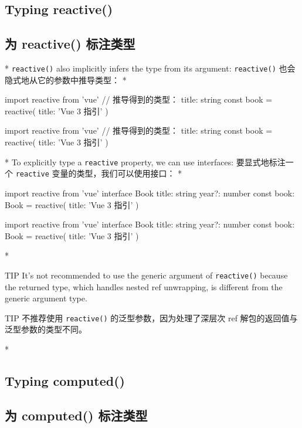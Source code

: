 \begin{paracol}{2}
\subsection{Typing reactive()}
\switchcolumn
\subsection{为 reactive() 标注类型}
\switchcolumn[0]*%
\texttt{reactive()} also implicitly infers the type from its argument:
\switchcolumn
\texttt{reactive()} 也会隐式地从它的参数中推导类型：
\switchcolumn[0]*%
\begin{codeTs}
import { reactive } from 'vue'
// 推导得到的类型：{ title: string }
const book = reactive({ title: 'Vue 3 指引' })
\end{codeTs}
\switchcolumn
\begin{codeTs}
import { reactive } from 'vue'
// 推导得到的类型：{ title: string }
const book = reactive({ title: 'Vue 3 指引' })
\end{codeTs}
\switchcolumn[0]*%
To explicitly type a \texttt{reactive} property, we can use interfaces:
\switchcolumn
要显式地标注一个 \texttt{reactive} 变量的类型，我们可以使用接口：
\switchcolumn[0]*%
\begin{codeTs}
import { reactive } from 'vue'
interface Book {
  title: string
  year?: number
}
const book: Book = reactive({ title: 'Vue 3 指引' })
\end{codeTs}
\switchcolumn
\begin{codeTs}
import { reactive } from 'vue'
interface Book {
  title: string
  year?: number
}
const book: Book = reactive({ title: 'Vue 3 指引' })
\end{codeTs}
\switchcolumn[0]*%
\begin{vueQuote}{TIP}
It's not recommended to use the generic argument of \texttt{reactive()}
because the returned type, which handles nested ref unwrapping, is
different from the generic argument type.
\end{vueQuote} 
\switchcolumn
\begin{vueQuote}{TIP}
不推荐使用 \texttt{reactive()} 的泛型参数，因为处理了深层次 ref
解包的返回值与泛型参数的类型不同。
\end{vueQuote} 
\switchcolumn[0]*%
\subsection{Typing computed()}
\switchcolumn
\subsection{为 computed() 标注类型}
\end{paracol}

